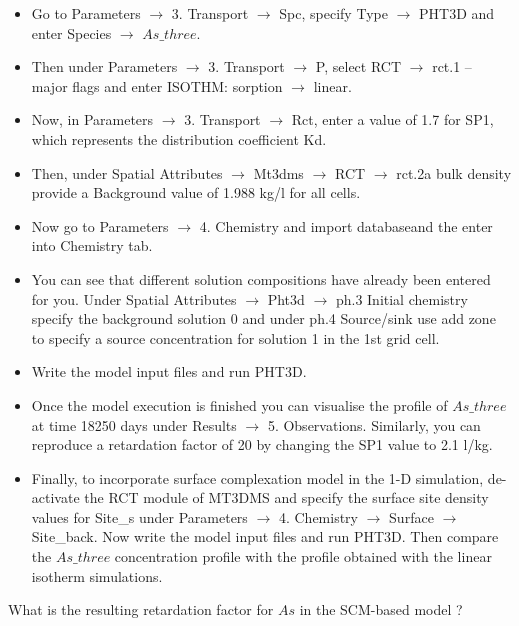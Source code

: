 \begin{itemize}
\item Go to {\color{blue}Parameters} $\rightarrow$ {\color{blue} 3. Transport} $\rightarrow$ {\color{blue} Spc}, specify {\color{blue} Type} $\rightarrow$ {\color{blue} PHT3D} and enter {\color{blue}Species} $\rightarrow$ \textbf{$As\_three$}. 

\item Then under {\color{blue} Parameters} $\rightarrow$ {\color{blue} 3. Transport} $\rightarrow$ {\color{blue} P}, select {\color{blue} RCT} $\rightarrow$ {\color{blue} rct.1 – major flags} 
and enter {\color{blue} ISOTHM: sorption} $\rightarrow$ {\color{blue} linear}. 

\item Now, in {\color{blue} Parameters} $\rightarrow$ {\color{blue} 3. Transport} $\rightarrow$ {\color{blue} Rct}, enter a value of 1.7 for {\color{blue} SP1}, which represents the distribution coefficient Kd. 

\item Then, under {\color{blue}Spatial Attributes} $\rightarrow$ {\color{blue} Mt3dms} $\rightarrow$ 
{\color{blue} RCT} $\rightarrow$ {\color{blue} rct.2a bulk density} provide a {\color{blue}Background} 
value of 1.988 kg/l for all cells.

\item Now go to {\color{blue}Parameters} $\rightarrow$ {\color{blue} 4. Chemistry} and {\color{blue} import database}and the enter into Chemistry tab. 
\item You can see that different solution compositions have already been entered for you. 
Under {\color{blue}Spatial Attributes} $\rightarrow$ {\color{blue}Pht3d} $\rightarrow$ {\color{blue}ph.3 Initial chemistry} specify the {\color{blue}background} solution 0 and under {\color{blue}ph.4 Source/sink} use {\color{blue}add zone} to specify a source concentration for solution 1 in the 1st grid cell. 
\item Write the model input files and run PHT3D. 
\item Once the model execution is finished you can visualise the profile of $As\_three$ 
at time 18250 days under {\color{blue}Results} $\rightarrow$ {\color{blue} 5. Observations}. 
Similarly, you can reproduce a retardation factor of 20 by changing the {\color{blue}SP1} value to 2.1 l/kg.

\item Finally, to incorporate surface complexation model in the 1-D simulation, de-activate the {\color{blue}RCT} module of MT3DMS and specify the surface site density values for {\color{blue}Site\_s} under {\color{blue}Parameters} $\rightarrow$ {\color{blue}4. Chemistry} $\rightarrow$ {\color{blue}Surface} $\rightarrow$ {\color{blue}Site\_back}. 
Now write the model input files and run PHT3D. Then compare the $As\_three$ concentration profile with the profile obtained with the linear isotherm simulations. \\
\end{itemize}

What is the resulting retardation factor for $As$ in the SCM-based model ?


